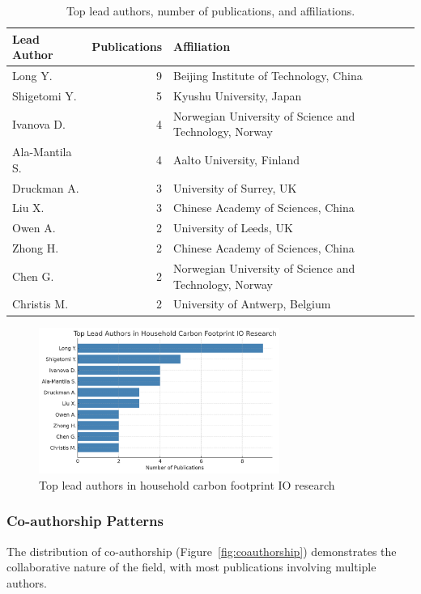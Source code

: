 \documentclass[12pt,a4paper]{article}%
\begin{document}
\begin{table}[h]
\centering
\caption{Top lead authors, number of publications, and affiliations.}\label{tab:lead_authors_affiliations}
\begin{tabular}{@{}lrl@{}}
\hline 
\textbf{Lead Author} & \textbf{Publications} & \textbf{Affiliation} \\
\hline
Long Y. & 9 & Beijing Institute of Technology, China \\
Shigetomi Y. & 5 & Kyushu University, Japan \\
Ivanova D. & 4 & Norwegian University of Science and Technology, Norway \\
Ala-Mantila S. & 4 & Aalto University, Finland \\
Druckman A. & 3 & University of Surrey, UK \\
Liu X. & 3 & Chinese Academy of Sciences, China \\
Owen A. & 2 & University of Leeds, UK \\
Zhong H. & 2 & Chinese Academy of Sciences, China \\
Chen G. & 2 & Norwegian University of Science and Technology, Norway \\
Christis M. & 2 & University of Antwerp, Belgium \\
\hline
\end{tabular}
\end{table}


\begin{figure}[h]
\centering
\includegraphics[width=0.7\textwidth]{Authors.png}
\caption{Top lead authors in household carbon footprint IO research}\label{fig:lead_authors}
\end{figure}

\subsubsection{Co-authorship Patterns}

The distribution of co-authorship (Figure~\ref{fig:coauthorship}) demonstrates the collaborative nature of the field, with most publications involving multiple authors.
\end{document}
